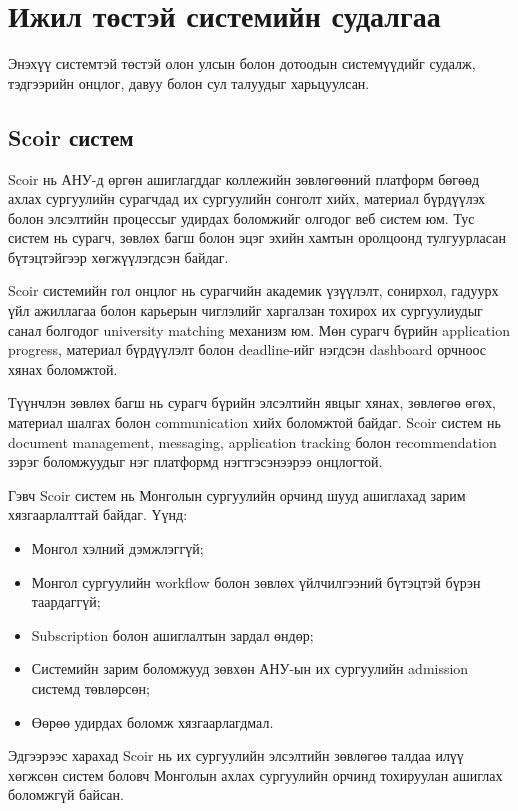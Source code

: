 \section{Ижил төстэй системийн судалгаа}

Энэхүү системтэй төстэй олон улсын болон дотоодын системүүдийг судалж, тэдгээрийн онцлог, давуу болон сул талуудыг харьцуулсан.

\subsection{Scoir систем}

Scoir нь АНУ-д өргөн ашиглагддаг коллежийн зөвлөгөөний платформ бөгөөд ахлах сургуулийн сурагчдад их сургуулийн сонголт хийх,
материал бүрдүүлэх болон элсэлтийн процессыг удирдах боломжийг олгодог
веб систем юм. Тус систем нь сурагч, зөвлөх багш болон эцэг эхийн хамтын
оролцоонд тулгуурласан бүтэцтэйгээр хөгжүүлэгдсэн байдаг.

Scoir системийн гол онцлог нь сурагчийн академик үзүүлэлт, сонирхол,
гадуурх үйл ажиллагаа болон карьерын чиглэлийг харгалзан тохирох их
сургуулиудыг санал болгодог university matching механизм юм. Мөн
сурагч бүрийн application progress, материал бүрдүүлэлт болон deadline-ийг
нэгдсэн dashboard орчноос хянах боломжтой.

Түүнчлэн зөвлөх багш нь сурагч бүрийн элсэлтийн явцыг хянах, зөвлөгөө өгөх,
материал шалгах болон communication хийх боломжтой байдаг. Scoir систем нь
document management, messaging, application tracking болон recommendation
зэрэг боломжуудыг нэг платформд нэгтгэсэнээрээ онцлогтой.

Гэвч Scoir систем нь Монголын сургуулийн орчинд шууд ашиглахад зарим
хязгаарлалттай байдаг. Үүнд:
\begin{itemize}
\item Монгол хэлний дэмжлэггүй;
\item Монгол сургуулийн workflow болон зөвлөх үйлчилгээний бүтэцтэй бүрэн таардаггүй;
\item Subscription болон ашиглалтын зардал өндөр;
\item Системийн зарим боломжууд зөвхөн АНУ-ын их сургуулийн admission системд төвлөрсөн;
\item Өөрөө удирдах боломж хязгаарлагдмал.
\end{itemize}

Эдгээрээс харахад Scoir нь их сургуулийн элсэлтийн зөвлөгөө талдаа илүү хөгжсөн
систем боловч Монголын ахлах сургуулийн орчинд тохируулан ашиглах боломжгүй байсан.

